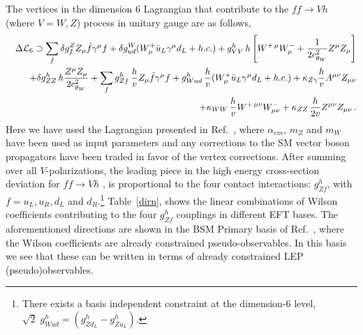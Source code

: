 \documentclass[../report.tex]{subfiles}
\begin{document}
The vertices in the dimension 6 Lagrangian that contribute 
to the $ff \to Vh$ (where $V=W,Z$) process in unitary gauge are as follows, 
\begin{eqnarray}
&&\Delta {\cal L}_6\supset \sum_f {\delta g^Z_{f}} Z_\mu \bar{f} \gamma^\mu f +\delta g^W_{ud} (W^+_\mu \bar{u}_L \gamma^\mu d_L+h.c.)
+ {g^h_{VV}}\,  h \left[W^{+\, \mu} W^-_\mu+\frac{1}{2c_{\theta_W}^2}Z^\mu Z_\mu\right]\nonumber \\
&&+  \delta g^h_{ZZ}\, h \frac{Z^\mu Z_\mu}{2c_{\theta_W}^2} + \sum_f g^h_{Zf}\,\frac{h}{v}Z_\mu \bar{f} \gamma^\mu f+g^h_{Wud}\,\frac{h}{v}(W^+_\mu \bar{u}_L \gamma^\mu d_L+h.c.)
+{\kappa_{Z \gamma }}\frac{h}{v} A^{\mu\nu} Z_{\mu\nu} \nonumber \\ 
&&+\kappa_{WW}\,\frac{h}{v}
 W^{+\, \mu\nu}W^-_{\mu\nu}
+\kappa_{ZZ}\,\frac{h}{2v} Z^{\mu\nu}Z_{\mu\nu}\,.
\label{lagr}
\end{eqnarray}
Here we have used the Lagrangian presented in Ref.~\cite{Gupta:2014rxa, Pomarol:2014dya}, where $\alpha_{em}$, $m_Z$ and $m_W$   have been used as input parameters and any corrections 
to the SM vector boson propagators  have 
been traded in favor of the vertex corrections. After summing over all $V$-polarizations, the leading 
piece in the high energy cross-section deviation for $ff \to Vh$ , is proportional to the four  contact interactions:  $g^h_{Zf}$, with $f=u_L, u_R,d_L$ and $d_R$.\footnote{There exists a basis independent constraint at the dimension-6 level, $\sqrt{2}\;g^h_{Wud}= (g^h_{Zd_L}-g^h_{Zu_L})$. } Table~\ref{dirn}, shows the linear combinations of Wilson coefficients contributing to the four 
$g^h_{Zf}$ couplings in different EFT bases.  The aforementioned directions are shown in the BSM Primary basis of Ref.~\cite{Gupta:2014rxa}, 
where the Wilson coefficients are already constrained pseudo-observables. In this basis we see that these can be written in terms of already constrained LEP (pseudo)observables. 
\end{document}
